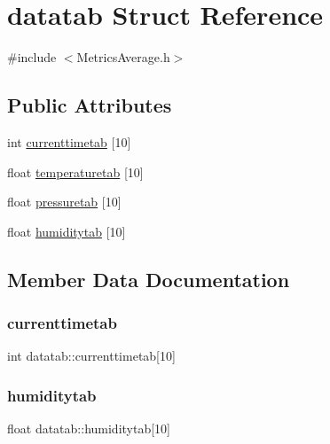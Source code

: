 \hypertarget{structdatatab}{}\section{datatab Struct Reference}
\label{structdatatab}


{\ttfamily \#include $<$Metrics\+Average.\+h$>$}

\subsection*{Public Attributes}
\begin{DoxyCompactItemize}
\item 
int \hyperlink{structdatatab_ac19f083c0dcb6a011d92b76ca7f486e6}{currenttimetab} \mbox{[}10\mbox{]}
\item 
float \hyperlink{structdatatab_aff78d9a5fd529111ab738f41bb6120c5}{temperaturetab} \mbox{[}10\mbox{]}
\item 
float \hyperlink{structdatatab_ab8d11176f31a5fb8851108aa8547470c}{pressuretab} \mbox{[}10\mbox{]}
\item 
float \hyperlink{structdatatab_a60cf168a28c9c467fcc24674084de1b0}{humiditytab} \mbox{[}10\mbox{]}
\end{DoxyCompactItemize}


\subsection{Member Data Documentation}
\mbox{\label{structdatatab_ac19f083c0dcb6a011d92b76ca7f486e6}} 
\subsubsection{\texorpdfstring{currenttimetab}{currenttimetab}}
{\footnotesize\ttfamily int datatab\+::currenttimetab\mbox{[}10\mbox{]}}

\mbox{\label{structdatatab_a60cf168a28c9c467fcc24674084de1b0}} 
\subsubsection{\texorpdfstring{humiditytab}{humiditytab}}
{\footnotesize\ttfamily float datatab\+::humiditytab\mbox{[}10\mbox{]}}


